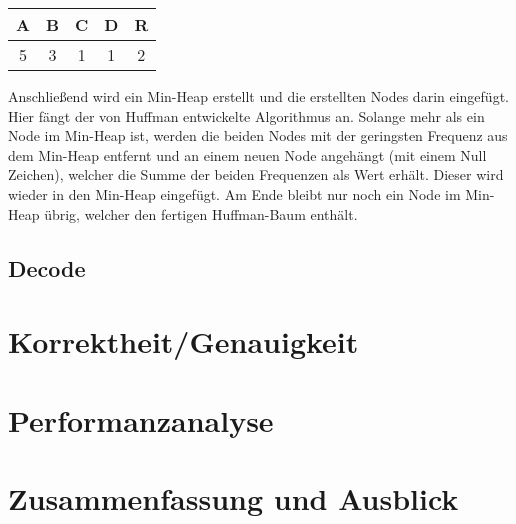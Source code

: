 \documentclass[course=erap]{aspdoc}
\begin{document}
\begin{center}
    \begin{tabular}{ |c|c|c|c|c| } 
     \hline
     A & B & C & D & R \\ 
     \hline
     5 & 3 & 1 & 1 & 2 \\ 
     \hline
    \end{tabular}
\end{center}

Anschließend wird ein Min-Heap erstellt und die erstellten Nodes darin eingefügt. Hier fängt der von Huffman entwickelte Algorithmus an. \cite{10.1145/3342555}
Solange mehr als ein Node im Min-Heap ist, werden die beiden Nodes mit der geringsten Frequenz aus dem Min-Heap entfernt und an einem neuen Node angehängt (mit einem Null Zeichen), welcher die Summe der beiden Frequenzen als Wert erhält. Dieser wird wieder in den Min-Heap eingefügt.
Am Ende bleibt nur noch ein Node im Min-Heap übrig, welcher den fertigen Huffman-Baum enthält.

\subsection{Decode}

\section{Korrektheit/Genauigkeit}


\section{Performanzanalyse}


\section{Zusammenfassung und Ausblick}


{}
\end{document}
